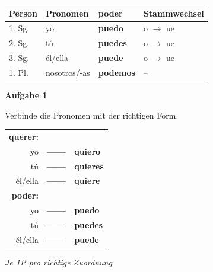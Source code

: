 \documentclass[11pt, a4paper]{article}
\newcommand{\fachfarbe}{spanisch}
\newcommand{\punktebox}[1]{\hfill\fbox{\small \_/#1}}
\newcommand{\lsg}[1]{\textcolor{loesung}{\textbf{#1}}}
\newenvironment{aufgabe}[1]{%
    \vspace{10pt}
    \noindent\textbf{\textcolor{\fachfarbe}{Aufgabe #1}}
    \vspace{5pt}
    \begin{list}{}{\leftmargin=0pt}
    \item[]
}{%
    \end{list}
}
\begin{document}
\begin{merkkasten}

\begin{center}
\begin{tabular}{|l|l|l|l|}
\hline
\textbf{Person} & \textbf{Pronomen} & \textbf{poder} & \textbf{Stammwechsel} \\
\hline
1. Sg. & yo & \lsg{puedo} & o $\rightarrow$ ue \\
\hline
2. Sg. & tú & \lsg{puedes} & o $\rightarrow$ ue \\
\hline
3. Sg. & él/ella & \lsg{puede} & o $\rightarrow$ ue \\
\hline
1. Pl. & nosotros/-as & \lsg{podemos} & -- \\
\hline
\end{tabular}
\end{center}

\end{merkkasten}

\vspace{15pt}


\begin{aufgabe}{1}
Verbinde die Pronomen mit der richtigen Form. \punktebox{6}
\end{aufgabe}

\begin{center}
\begin{tabular}{rcl}
\textbf{querer:} & & \\[0.5em]
yo & \lsg{------} & \lsg{quiero} \\[0.8em]
tú & \lsg{------} & \lsg{quieres} \\[0.8em]
él/ella & \lsg{------} & \lsg{quiere} \\[1em]
\textbf{poder:} & & \\[0.5em]
yo & \lsg{------} & \lsg{puedo} \\[0.8em]
tú & \lsg{------} & \lsg{puedes} \\[0.8em]
él/ella & \lsg{------} & \lsg{puede} \\
\end{tabular}
\end{center}

\textit{\textcolor{grau}{Je 1P pro richtige Zuordnung}}

\vspace{15pt}
\end{document}

